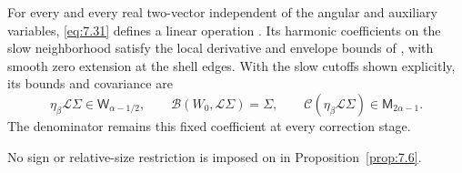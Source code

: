 \begin{proposition}\label{prop:7.6}
For every  and every real two-vector
 independent of the angular and
auxiliary variables, \eqref{eq:7.31} defines a linear operation
. Its harmonic coefficients on the slow
neighborhood satisfy the local derivative and envelope bounds of
, with smooth zero extension at the shell
edges. With the slow cutoffs shown explicitly, its bounds and covariance are
\begin{equation}
  \eta_\beta\mathcal L\Sigma\in\mathsf W_{\alpha-1/2},
  \qquad
  \mathcal B(W_0,\mathcal L\Sigma)=\Sigma,
  \qquad
  \mathcal C(\eta_\beta\mathcal L\Sigma)\in\mathsf M_{2\alpha-1}.
  \tag{7.32}\label{eq:7.32}
\end{equation}
The denominator  remains this fixed coefficient
at every correction stage.
\end{proposition}

No sign or relative-size restriction is imposed on
 in Proposition~\ref{prop:7.6}.

